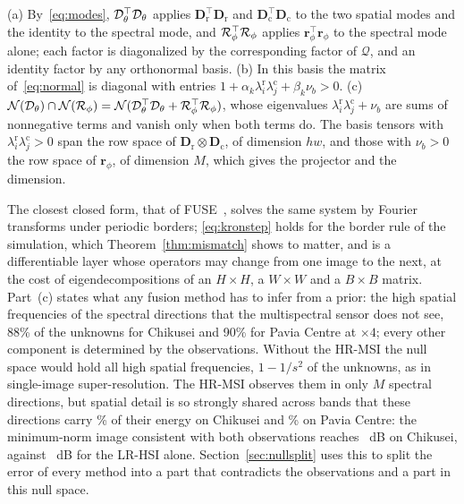 \documentclass[journal]{IEEEtran}
\begin{document}
\begin{IEEEproof}
(a) By~\eqref{eq:modes}, $\mathcal{D}_\theta^{\top}\mathcal{D}_\theta$ applies $\mathbf{D}_{\mathrm{r}}^{\top}\mathbf{D}_{\mathrm{r}}$ and $\mathbf{D}_{\mathrm{c}}^{\top}\mathbf{D}_{\mathrm{c}}$ to the two spatial modes and the identity to the spectral mode, and $\mathcal{R}_\phi^{\top}\mathcal{R}_\phi$ applies $\mathbf{r}_\phi^{\top}\mathbf{r}_\phi$ to the spectral mode alone; each factor is diagonalized by the corresponding factor of $\mathcal{Q}$, and an identity factor by any orthonormal basis. (b) In this basis the matrix of~\eqref{eq:normal} is diagonal with entries $1+\alpha_k\lambda^{\mathrm{r}}_i\lambda^{\mathrm{c}}_j+\beta_k\nu_b>0$. (c) $\mathcal{N}(\mathcal{D}_\theta)\cap\mathcal{N}(\mathcal{R}_\phi)=\mathcal{N}(\mathcal{D}_\theta^{\top}\mathcal{D}_\theta+\mathcal{R}_\phi^{\top}\mathcal{R}_\phi)$, whose eigenvalues $\lambda^{\mathrm{r}}_i\lambda^{\mathrm{c}}_j+\nu_b$ are sums of nonnegative terms and vanish only when both terms do. The basis tensors with $\lambda^{\mathrm{r}}_i\lambda^{\mathrm{c}}_j>0$ span the row space of $\mathbf{D}_{\mathrm{r}}\otimes\mathbf{D}_{\mathrm{c}}$, of dimension $hw$, and those with $\nu_b>0$ the row space of $\mathbf{r}_\phi$, of dimension $M$, which gives the projector and the dimension.
\end{IEEEproof}
The closest closed form, that of FUSE~\cite{wei2015fuse}, solves the same system by Fourier transforms under periodic borders; \eqref{eq:kronstep} holds for the border rule of the simulation, which Theorem~\ref{thm:mismatch} shows to matter, and is a differentiable layer whose operators may change from one image to the next, at the cost of eigendecompositions of an $H\times H$, a $W\times W$ and a $B\times B$ matrix. Part~(c) states what any fusion method has to infer from a prior: the high spatial frequencies of the spectral directions that the multispectral sensor does not see, 88\% of the unknowns for Chikusei and 90\% for Pavia Centre at $\times4$; every other component is determined by the observations. Without the HR-MSI the null space would hold all high spatial frequencies, $1-1/s^2$ of the unknowns, as in single-image super-resolution. The HR-MSI observes them in only $M$ spectral directions, but spatial detail is so strongly shared across bands that these directions carry \% of their energy on Chikusei and \% on Pavia Centre: the minimum-norm image consistent with both observations reaches ~dB on Chikusei, against ~dB for the LR-HSI alone. Section~\ref{sec:nullsplit} uses this to split the error of every method into a part that contradicts the observations and a part in this null space.
\end{document}
